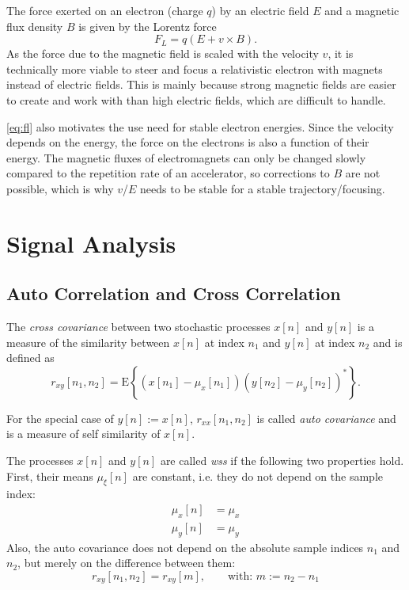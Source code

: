 The force exerted on an electron (charge $q$) by an electric field $E$ and a magnetic flux density $B$ is given by the Lorentz force \cite[p.~19]{Hinterberger1997}
\begin{equation}\label{eq:fl}
F_L = q\left(E+v\times B\right).
\end{equation}
As the force due to the magnetic field is scaled with the velocity $v$, it is technically more viable to steer and focus a relativistic electron with magnets instead of electric fields. This is mainly because strong magnetic fields are easier to create and work with than high electric fields, which are difficult to handle. \cite[p.~27]{Krieger2013}

\autoref{eq:fl} also motivates the use need for stable electron energies. Since the velocity depends on the energy, the force on the electrons is also a function of their energy. The magnetic fluxes of electromagnets can only be changed slowly compared to the repetition rate of an accelerator, so corrections to $B$ are not possible, which is why $v$/$E$ needs to be stable for a stable trajectory/focusing.




\section{Signal Analysis}
\subsection{Auto Correlation and Cross Correlation}
The \textit{cross covariance} between two stochastic processes $x[n]$ and $y[n]$ is a measure of the similarity between $x[n]$ at index $n_1$ and $y[n]$ at index $n_2$ and is defined as
\begin{equation}\label{eq:crosscovariance}
r_{xy}[n_1,n_2] = \text{E}\left\{(x[n_1]-\mu_x[n_1])(y[n_2]-\mu_y[n_2])^\ast\right\}.
\end{equation}

For the special case of $y[n]:=x[n]$, $r_{xx}[n_1,n_2]$ is called \textit{auto covariance} and is a measure of self similarity of $x[n]$. \cite[p.~172]{Park2017}

The processes $x[n]$ and $y[n]$ are called \textit{\gls{wss}} if the following two properties hold. \cite[p.~167]{Park2017}
First, their means $\mu_{\xi}[n]$ are constant, i.e. they do not depend on the sample index:
\begin{align}\label{eq:wss}
\mu_{x}[n] &= \mu_x\\
\mu_{y}[n] &= \mu_y
\end{align}
Also, the auto covariance does not depend on the absolute sample indices $n_1$ and $n_2$, but merely on the difference between them:
\begin{equation}
r_{xy}[n_1,n_2] = r_{xy}[m],\qquad \text{with: } m:=n_2-n_1
\end{equation}

